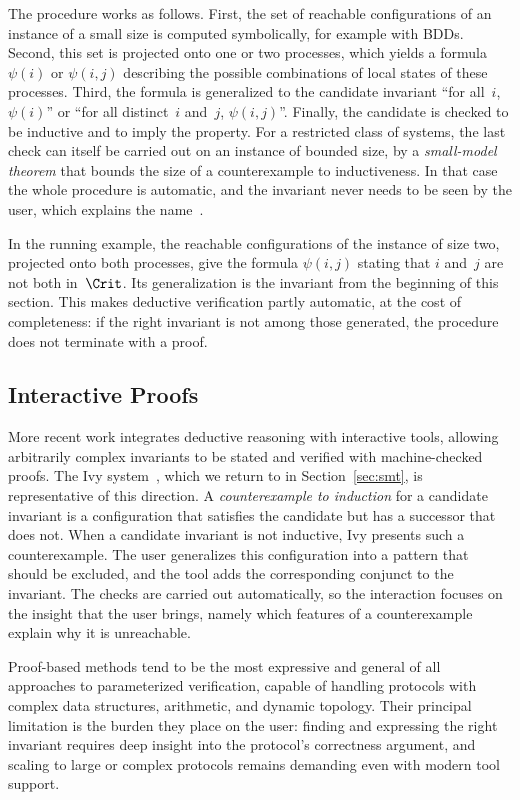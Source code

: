The procedure works as follows. First, the set of reachable configurations of
an instance of a small size is computed symbolically, for example with BDDs.
Second, this set is projected onto one or two processes, which yields a
formula $\psi(i)$ or $\psi(i,j)$ describing the possible combinations of local
states of these processes. Third, the formula is generalized to the candidate
invariant ``for all~$i$, $\psi(i)$'' or ``for all distinct~$i$ and~$j$,
$\psi(i,j)$''. Finally, the candidate is checked to be inductive and to imply
the property. For a restricted class of systems, the last check can itself be
carried out on an instance of bounded size, by a \emph{small-model theorem}
that bounds the size of a counterexample to inductiveness. In that case the
whole procedure is automatic, and the invariant never needs to be seen by the
user, which explains the name~\cite{ZP04}.

In the running example, the reachable configurations of the instance of size
two, projected onto both processes, give the formula $\psi(i,j)$ stating that
$i$ and~$j$ are not both in~$\Crit$. Its generalization is the invariant from
the beginning of this section. This makes deductive verification partly
automatic, at the cost of completeness: if the right invariant is not among
those generated, the procedure does not terminate with a proof.

\subsection{Interactive Proofs}

More recent work integrates deductive reasoning with interactive tools,
allowing arbitrarily complex invariants to be stated and verified with
machine-checked proofs. The Ivy system~\cite{PMPSS16}, which we return to in
Section~\ref{sec:smt}, is representative of this direction. A
\emph{counterexample to induction} for a candidate invariant is a
configuration that satisfies the candidate but has a successor that does not.
When a candidate invariant is not inductive, Ivy presents such a
counterexample. The user generalizes this configuration into a pattern that should be
excluded, and the tool adds the corresponding conjunct to the invariant. The
checks are carried out automatically, so the interaction focuses on the
insight that the user brings, namely which features of a counterexample
explain why it is unreachable.

Proof-based methods tend to be the most expressive and general of all
approaches to parameterized verification, capable of handling protocols with
complex data structures, arithmetic, and dynamic topology. Their principal
limitation is the burden they place on the user: finding and expressing the
right invariant requires deep insight into the protocol's correctness
argument, and scaling to large or complex protocols remains demanding even
with modern tool support.
